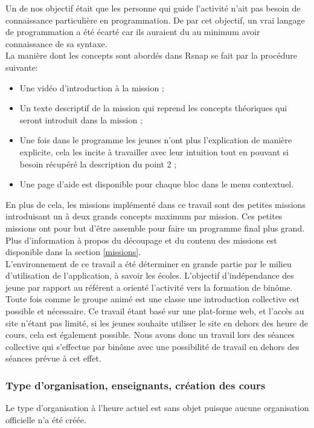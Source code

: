 Un de nos objectif était que les personne qui guide l'activité n'ait pas besoin de connaissance particulière en programmation. De par cet objectif, un vrai langage de programmation a été écarté car ils auraient du au minimum avoir connaissance de sa syntaxe.\\

La manière dont les concepts sont abordés dans Rsnap se fait par la procédure suivante:
\begin{itemize}
	\item Une vidéo d'introduction à la mission ;
	\item Un texte descriptif de la mission qui reprend les concepts théoriques qui seront introduit dans la mission ;
	\item Une fois dans le programme les jeunes n'ont plus l'explication de manière explicite, cela les incite à travailler avec leur intuition tout en pouvant si besoin récupéré la description du point 2 ;
	\item Une page d'aide est disponible pour chaque bloc dans le menu contextuel.
\end{itemize}

En plus de cela, les missions implémenté dans ce travail sont des petites missions introduisant un à deux grands concepts maximum par mission. Ces petites missions ont pour but d'être assemble pour faire un programme final plus grand. Plus d'information à propos du découpage et du contenu des missions est disponible dans la section \ref{missions}.\\

L'environnement de ce travail a été déterminer en grande partie par le milieu d'utilisation de l'application, à savoir les écoles. L'objectif d'indépendance des jeune par rapport au référent a orienté l'activité vers la formation de binôme. Toute fois comme le groupe animé est une classe une introduction collective est possible et nécessaire. Ce travail étant basé sur une plat-forme web, et l'accès au site n'étant pas limité, si les jeunes souhaite utiliser le site en dehors des heure de cours, cela est également possible.
Nous avons donc un travail lors des séances collective qui s'effectue par binôme avec une possibilité de travail en dehors des séances prévue à cet effet.

\subsubsection{Type d'organisation, enseignants, création des cours}
Le type d'organisation à l'heure actuel est sans objet puisque aucune organisation officielle n'a été créée.\\

